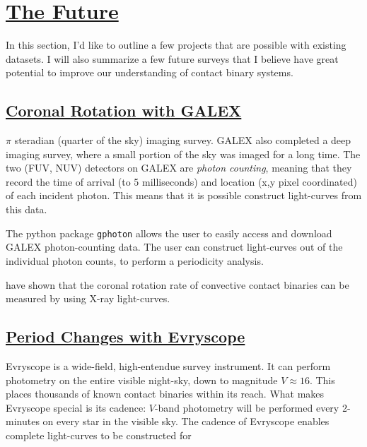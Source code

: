 \documentclass[12pt]{article} %
\numberwithin{equation}{section} %
\begin{document}
\citep{bradstreet1988mapping}


\section[The Future]{\hyperlink{toc}{The Future}} \label{sec: The Future}

In this section, I'd like to outline a few projects that are possible with existing datasets. I will also summarize a few future surveys that I believe have great potential to improve our understanding of contact binary systems.

\subsection[Coronal Rotation with GALEX]{\hyperlink{toc}{Coronal Rotation with GALEX}}

$\pi$ steradian (quarter of the sky) imaging survey. GALEX also completed a deep imaging survey, where a small portion of the sky was imaged for a long time. The two (FUV, NUV) detectors on GALEX are \emph{photon counting}, meaning that they record the time of arrival (to 5 milliseconds) and location (x,y pixel coordinated) of each incident photon. This means that it is possible construct light-curves from this data.

The python package \texttt{gphoton} allows the user to easily access and download GALEX photon-counting data. The user can construct light-curves out of the individual photon counts, to perform a periodicity analysis.

\citet{mccale1996rosat} have shown that the coronal rotation rate of convective contact binaries can be measured by using X-ray light-curves.

\subsection[Period Changes with Evryscope]{\hyperlink{toc}{Period Changes with Evryscope}}

Evryscope is a wide-field, high-entendue survey instrument. It can perform photometry on the entire visible night-sky, down to magnitude $V \approx 16$. This places thousands of known contact binaries within its reach. What makes Evryscope special is its cadence: $V$-band photometry will be performed every 2-minutes on every star in the visible sky. The cadence of Evryscope enables complete light-curves to be constructed for  
\end{document}

